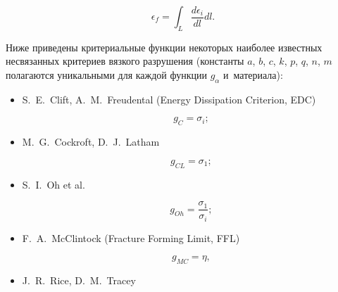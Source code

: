 $$\epsilon_f=\int_L \frac{d\epsilon_i}{dl}dl.$$ 



Ниже приведены критериальные функции некоторых наиболее известных несвязанных критериев вязкого разрушения (константы $a$, $b$, $c$, $k$, $p$, $q$, $n$, $m$ полагаются уникальными для каждой функции  $g_{\alpha}$ и~материала):

\begin{itemize}

\item[--] 

S.~E.~Clift, A.~M.~Freudental (Energy Dissipation Criterion, EDC) \cite{keller:bib:Freudenthal, keller:bib:clift} 

\begin{equation}

	g_{C}=\sigma_i;

\end{equation}



\item[--] 

M.~G.~Cockroft, D.~J.~Latham \cite{keller:bib:cockroft}

\begin{equation}

	g_{CL}=\sigma_1;

\end{equation}



\item[--] 

S.~I.~Oh et al. \cite{keller:bib:oh}

\begin{equation}

	g_{Oh}=\frac{\sigma_1}{\sigma_i};

\end{equation}



\item[--]

F.~A.~McClintock  \cite{keller:bib:mcclintock} (Fracture Forming Limit, FFL)

\begin{equation}

	g_{MC}=\eta,

\end{equation}



\item[--]

J.~R.~Rice, D.~M.~Tracey  \cite{keller:bib:rice}


\end{itemize}
